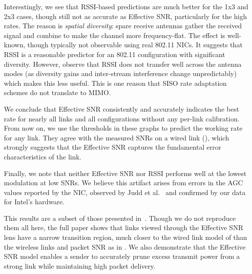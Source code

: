 Interestingly, we see that RSSI-based predictions are much better for the 1x3 and 2x3 cases, though still not as accurate as Effective SNR, particularly for the high rates. The reason is \emph{spatial diversity}: spare receive antennas gather the received signal and combine to make the channel more frequency-flat. The effect is well-known, though typically not observable using real 802.11 NICs. It suggests that RSSI is a reasonable predictor for an 802.11 configuration with significant diversity. However, observe that RSSI does not transfer well across the antenna modes (as diversity gains and inter-stream interference change unpredictably) which makes this less useful. This is one reason that SISO rate adaptation schemes do not translate to MIMO\@.

We conclude that Effective SNR consistently and accurately indicates the best rate for nearly all links and all configurations without any per-link calibration. From now on, we use the thresholds in these graphs to predict the working rate for any link. They agree with the measured SNRs on a wired link (), which strongly suggests that the Effective SNR captures the fundamental error characteristics of the link. 

Finally, we note that neither Effective SNR nor RSSI performs well at the lowest modulation at low SNRs. We believe this artifact arises from errors in the AGC values reported by the NIC, observed by Judd et al.~\cite{Judd_CHARM} and confirmed by our data for Intel's hardware.

 This results are a subset of those presented in~\cite{Halperin_ESNR}. Though we do not reproduce them all here, the full paper shows that links viewed through the Effective SNR lens have a narrow transition region, much closer to the wired link model of  than the wireless links and packet SNR as in . We also demonstrate that the Effective SNR model enables a sender to accurately prune excess transmit power from a strong link while maintaining high packet delivery.

\ifx\mainfile\undefined

\fi
